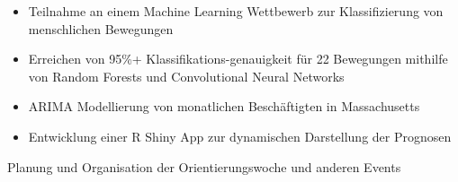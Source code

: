 
\begin{itemize}
    \item Teilnahme an einem Machine Learning Wettbewerb zur Klassifizierung von menschlichen Bewegungen %
    \item Erreichen von 95\%+ Klassifikations-genauigkeit für  22 Bewegungen mithilfe von Random Forests und Convolutional Neural Networks
\end{itemize}

\divider

\begin{itemize}
    \item ARIMA Modellierung von monatlichen Beschäftigten in Massachusetts
    \item Entwicklung einer R Shiny App zur dynamischen Darstellung der Prognosen
\end{itemize}







Planung und Organisation der Orientierungswoche und anderen Events

